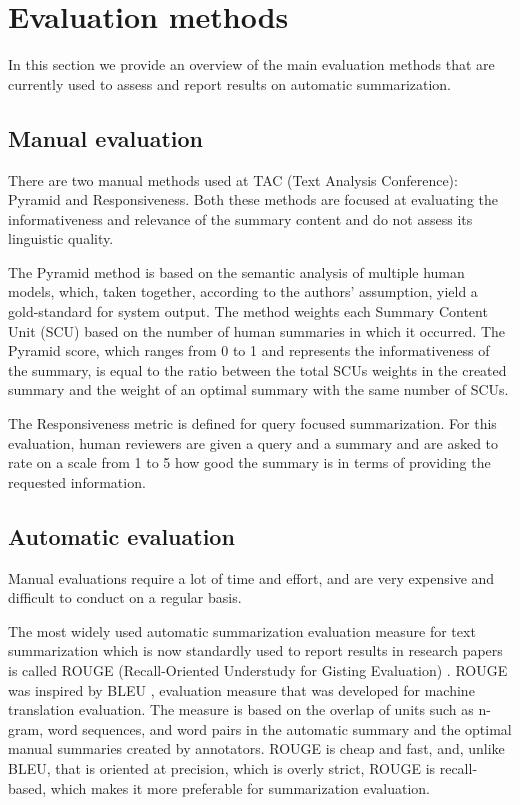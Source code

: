 \documentclass[11pt,a4paper,onecolumn]{article}
\begin{document}
\section{Evaluation methods}
In this section we provide an overview of the main evaluation methods that are currently used to assess and report results on automatic summarization.

\subsection{Manual evaluation}
There are two manual methods used at TAC (Text Analysis Conference): Pyramid and Responsiveness.
Both these methods are focused at evaluating the informativeness and relevance of the summary content and do not assess its linguistic quality.

The Pyramid method \cite{nenkova2007pyramid} is based on the semantic analysis of multiple human models, which, taken together, according to the authors' assumption, yield a gold-standard for system output.
The method weights each Summary Content Unit (SCU) based on the number of human summaries in which it occurred.
The Pyramid score, which ranges from 0 to 1 and represents the informativeness of the summary, is equal to the ratio between the total SCUs weights in the created summary and the weight of an optimal summary with the same number of SCUs.

The Responsiveness metric is defined for query focused summarization.
For this evaluation, human reviewers are given a query and a summary and are asked to rate on a scale from 1 to 5 how good the summary is in terms of providing the requested information.

\subsection{Automatic evaluation}
Manual evaluations require a lot of time and effort, and are very expensive and difficult to conduct on a regular basis.

The most widely used automatic summarization evaluation measure for text summarization which is now standardly used to report results in research papers is called ROUGE (Recall-Oriented Understudy for Gisting Evaluation) \cite{lin2004rouge}.
ROUGE was inspired by BLEU \cite{papineni2002bleu}, evaluation measure that was developed for machine translation evaluation.
The measure is based on the overlap of units such as n-gram, word sequences, and word pairs in the automatic summary and the optimal manual summaries created by annotators.
ROUGE is cheap and fast, and, unlike BLEU, that is oriented at precision, which is overly strict, ROUGE is recall-based, which makes it more preferable for summarization evaluation.
\end{document}

